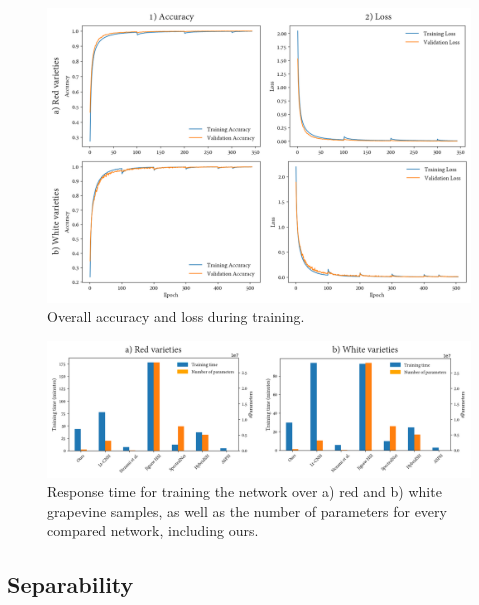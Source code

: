 \begin{figure}[ht]
    \centering
    \includegraphics[width=.9\linewidth]{figs/vineyard_classification/training_history.png}
	\caption{Overall accuracy and loss during training. }
	\label{fig:training_history}
\end{figure}

\begin{figure}[ht]
    \centering
    \includegraphics[width=.85\linewidth]{figs/vineyard_classification/time_capacity_network.png}
	\caption{Response time for training the network over a) red and b) white grapevine samples, as well as the number of parameters for every compared network, including ours.  }
	\label{fig:time_capacity_networks}
\end{figure}

\subsection{Separability}

